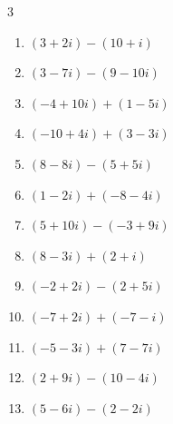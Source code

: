 \begin{multicols}{3}
\begin{enumerate}
        \phantom{$\displaystyle =-11-9i$}

  \item $\displaystyle (3+2i) - (10+i)$

        \phantom{$\displaystyle =-7+i$}

  \item $\displaystyle (3-7i) - (9-10i)$

        \phantom{$\displaystyle =-6+3i$}

  \item $\displaystyle (-4+10i) + (1-5i)$

        \phantom{$\displaystyle =-3+5i$}

  \item $\displaystyle (-10+4i) + (3-3i)$

        \phantom{$\displaystyle =-7+i$}

  \item $\displaystyle (8-8i) - (5+5i)$

        \phantom{$\displaystyle =3-13i$}

\columnbreak %

  \item $\displaystyle (1-2i) + (-8-4i)$

        \phantom{$\displaystyle =-7-6i$}

  \item $\displaystyle (5+10i) - (-3+9i)$

        \phantom{$\displaystyle =8+i$}

  \item $\displaystyle (8-3i) + (2+i)$

        \phantom{$\displaystyle =10-2i$}

  \item $\displaystyle (-2+2i) - (2+5i)$

        \phantom{$\displaystyle =-4-3i$}

  \item $\displaystyle (-7+2i) + (-7-i)$

        \phantom{$\displaystyle =-14+i$}

  \item $\displaystyle (-5-3i) + (7-7i)$

        \phantom{$\displaystyle =2-10i$}

  \item $\displaystyle (2+9i) - (10-4i)$

        \phantom{$\displaystyle =-8+13i$}

  \item $\displaystyle (5-6i) - (2-2i)$


\end{enumerate}
\end{multicols}
